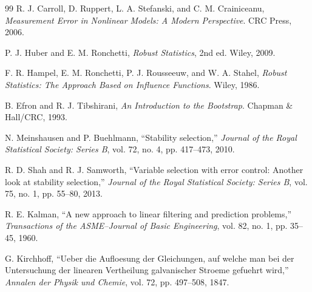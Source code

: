 \documentclass[UTF8,11pt]{ctexart}
\begin{document}
\begin{thebibliography}{99}
R. J. Carroll, D. Ruppert, L. A. Stefanski, and C. M. Crainiceanu,
\emph{Measurement Error in Nonlinear Models: A Modern Perspective}.
CRC Press, 2006.

P. J. Huber and E. M. Ronchetti,
\emph{Robust Statistics}, 2nd ed.
Wiley, 2009.

F. R. Hampel, E. M. Ronchetti, P. J. Rousseeuw, and W. A. Stahel,
\emph{Robust Statistics: The Approach Based on Influence Functions}.
Wiley, 1986.

B. Efron and R. J. Tibshirani,
\emph{An Introduction to the Bootstrap}.
Chapman \& Hall/CRC, 1993.

N. Meinshausen and P. Buehlmann,
``Stability selection,''
\emph{Journal of the Royal Statistical Society: Series B}, vol. 72, no. 4, pp. 417--473, 2010.

R. D. Shah and R. J. Samworth,
``Variable selection with error control: Another look at stability selection,''
\emph{Journal of the Royal Statistical Society: Series B}, vol. 75, no. 1, pp. 55--80, 2013.

R. E. Kalman,
``A new approach to linear filtering and prediction problems,''
\emph{Transactions of the ASME--Journal of Basic Engineering}, vol. 82, no. 1, pp. 35--45, 1960.

G. Kirchhoff,
``Ueber die Aufloesung der Gleichungen, auf welche man bei der Untersuchung der linearen Vertheilung galvanischer Stroeme gefuehrt wird,''
\emph{Annalen der Physik und Chemie}, vol. 72, pp. 497--508, 1847.

\end{thebibliography}
\end{document}
